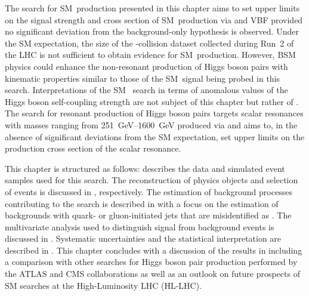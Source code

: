 The search for SM~\HH production presented in this chapter aims to set upper
limits on the signal strength and cross section of SM~\HH production via \ggF
and VBF provided no significant deviation from the background-only hypothesis is
observed. Under the SM expectation, the size of the \pp-collision dataset
collected during Run~2 of the LHC is not sufficient to obtain evidence for
SM~\HH production. However, BSM physics could enhance the non-resonant
production of Higgs boson pairs with kinematic properties similar to those of
the SM~\HH signal being probed in this search. Interpretations of the SM~\HH
search in terms of anomalous values of the Higgs boson self-coupling strength
are not subject of this chapter but rather of
. The search for resonant production of Higgs
boson pairs targets scalar resonances with masses ranging from
\SIrange{251}{1600}{\GeV} produced via \ggF and aims to, in the absence of
significant deviations from the SM expectation, set upper limits on the
production cross section of the scalar resonance.

This chapter is structured as follows:  describes
the data and simulated event samples used for this search. The reconstruction of
physics objects and selection of events is discussed in
, respectively. The
estimation of background processes contributing to the search is described in
 with a focus on the estimation of backgrounds
with quark- or gluon-initiated jets that are misidentified as \tauhadvis. The
multivariate analysis used to distinguish signal from background events is
discussed in . Systematic uncertainties and the
statistical interpretation are described in
. This chapter concludes with a
discussion of the results in  including a comparison
with other searches for Higgs boson pair production performed by the ATLAS and
CMS collaborations as well as an outlook on future prospects of SM \HH searches
at the High-Luminosity LHC (HL-LHC).


